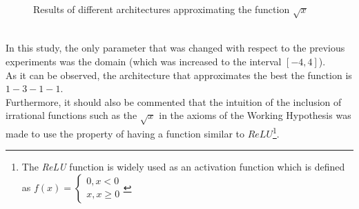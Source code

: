 \documentclass[a4paper, 11pt]{article}
\begin{document}
\begin{figure}[h]
    \caption{Results of different architectures approximating the function $\sqrt{x}$}
    \label{sqrt100}
\end{figure}\\
In this study, the only parameter that was changed with respect to the previous experiments was the domain (which was increased to the interval $[-4,4]$).\\
As it can be observed, the architecture that approximates the best the function is $1-3-1-1$.\\
Furthermore, it should also be commented that the intuition of the inclusion of irrational functions such as the $\sqrt{x}$ in the axioms of the Working Hypothesis was made to use the property of having a function similar to $ReLU$\footnote{The \textit{ReLU} function is widely used as an activation function which is defined as $f(x) = \left\{ \begin{matrix} 0, x < 0 \\ x, x\geq 0\end{matrix} \right.$}.\\
\end{document}
